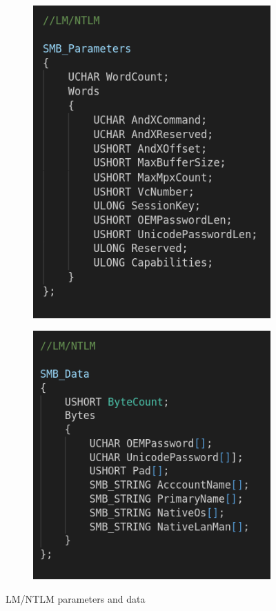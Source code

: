 \begin{figure}[h]
    
  \begin{subfigure}{0.5\textwidth}
    \begin{center}
      \includegraphics[scale=0.35]{images/lm_ntm_params.png}
    \end{center}
  \end{subfigure}
  \begin{subfigure}{0.5\textwidth}
    \begin{center}
      \includegraphics[scale=0.35]{images/lm_ntm_data.png}
    \end{center}
  \end{subfigure}
  \caption{LM/NTLM parameters and data}
\end{figure}



